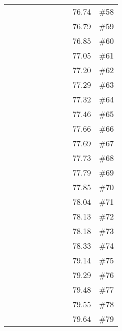 \begin{longtable}{|c|c|c|c|c|c|c|c|c|c|}
 \x    & \x    & \x    & \x    &       &       &       &       & 76.74 & \#58 \\
 \x    & \x    &       &       & \x\m  &       &       &       & 76.79 & \#59 \\
 \x    & \x    &       & \x    & \x\m  & \x\m  &       &       & 76.85 & \#60 \\
 \x    & \x    &       & \x    & \x\m  &       &       & \x\m  & 77.05 & \#61 \\
 \x    & \x    & \x    & \x    &       & \x    & \x    &       & 77.20 & \#62 \\
 \x    & \x    & \x    & \x    & \x    & \x    &       &       & 77.29 & \#63 \\
 \x    & \x    & \x    &       &       & \x\m  & \x    &       & 77.32 & \#64 \\
 \x    & \x    & \x    &       & \x    & \x    &       & \x\m  & 77.46 & \#65 \\
 \x    & \x    & \x    & \x    &       &       &       &       & 77.66 & \#66 \\
 \x    & \x    &       &       & \x    &       &       &       & 77.69 & \#67 \\
 \x    & \x    & \x    &       & \x    & \x\m  & \x\m  &       & 77.73 & \#68 \\
 \x    & \x    &       & \x    & \x\m  &       &       &       & 77.79 & \#69 \\
 \x    & \x    & \x    & \x    & \x    & \x\m  & \x    &       & 77.85 & \#70 \\
 \x    & \x    & \x    & \x    &       & \x    &       &       & 78.04 & \#71 \\
 \x    & \x    &       &       & \x\m  &       & \x\m  &       & 78.13 & \#72 \\
 \x    & \x    & \x    &       & \x    & \x\m  &       & \x    & 78.18 & \#73 \\
 \x    & \x    & \x    & \x    &       & \x\m  & \x\m  &       & 78.33 & \#74 \\
 \x    & \x    & \x    & \x    &       &       &       & \x\m  & 79.14 & \#75 \\
 \x    & \x    & \x    &       &       &       &       &       & 79.29 & \#76 \\
 \x    & \x    & \x    &       &       & \x\m  &       & \x\m  & 79.48 & \#77 \\
 \x    & \x    & \x    & \x    &       & \x\m  &       & \x\m  & 79.55 & \#78 \\
 \x    & \x    & \x    &       &       &       &       & \x\m  & 79.64 & \#79 \\

\end{longtable}
